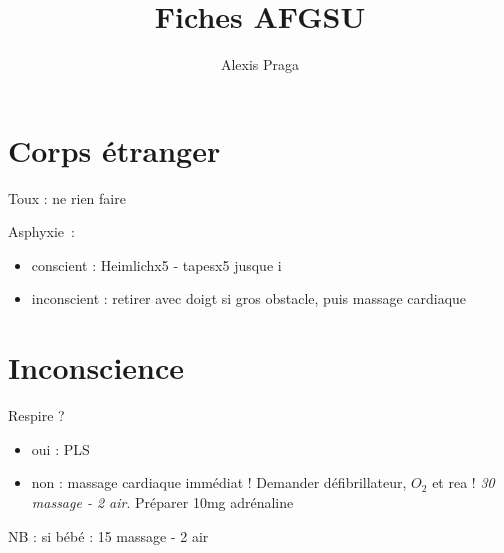 \documentclass{article}
\begin{document}
\title{Fiches AFGSU}
\author{Alexis Praga}
\maketitle

\section{Corps étranger}%
\label{sec:corps_etranger}

  Toux : ne rien faire

Asphyxie :
\begin{itemize}
  \item conscient : Heimlichx5 - tapesx5 jusque i
  \item inconscient : retirer avec doigt si gros obstacle, puis massage
    cardiaque
\end{itemize}

\section{Inconscience}%
\label{sec:inconscience}

Respire ?
\begin{itemize}
  \item oui : PLS
  \item non : massage cardiaque immédiat ! Demander défibrillateur, $O_2$ et rea !
    \textit{30 massage - 2 air}. Préparer 10mg adrénaline
\end{itemize}

NB : si bébé : 15 massage - 2 air
\end{document}
